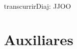 \documentclass[a4paper]{article}
\begin{document}
\begin{problema}{transcurrirDia}{j: JJOO}{}
\end{problema}
	
	
	
\section{Auxiliares}


\end{document}
